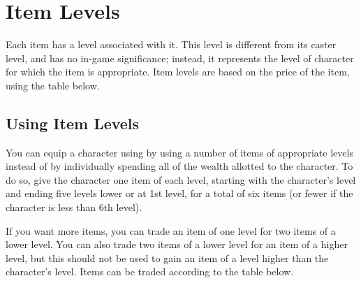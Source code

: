 \section{Item Levels}

Each item has a level associated with it. This level is different from its caster level, and has no in-game significance; instead, it represents the level of character for which the item is appropriate. Item levels are based on the price of the item, using the table below.

\subsection{Using Item Levels}

You can equip a character using by using a number of items of appropriate levels instead of by individually spending all of the wealth allotted to the character. To do so, give the character one item of each level, starting with the character's level and ending five levels lower or at 1st level, for a total of six items (or fewer if the character is less than 6th level).

If you want more items, you can trade an item of one level for two items of a lower level. You can also trade two items of a lower level for an item of a higher level, but this should not be used to gain an item of a level higher than the character's level. Items can be traded according to the table below.

